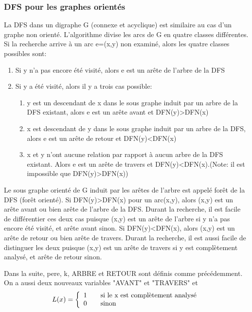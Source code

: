 \subsubsection{DFS pour les graphes orientés}
La DFS dans un digraphe G (connexe et acyclique) est similaire au cas d'un graphe non orienté. L'algorithme divise les arcs de G en quatre classes différentes. Si la recherche arrive à un arc e=(x,y) non examiné, alors les quatre classes possibles sont:
\begin{enumerate}
	\item Si y n'a pas encore été visité, alors e est un arête de l'arbre de la DFS
	\item Si y a été visité, alors il y a trois cas possible:
	\begin{enumerate}
		\item y est un descendant de x dans le sous graphe induit par un arbre de la DFS existant, alors e est un arête avant et DFN(y)>DFN(x)
		\item  x est descendant de y dans le sous graphe induit par un arbre de la DFS, alors e est un arête de retour et DFN(y)<DFN(x)
		\item x et y n'ont aucune relation par rapport à aucun arbre de la DFS existant. Alors e est un arête de travers et  DFN(y)<DFN(x).(Note: il est impossible que DFN(y)>DFN(x))
	\end{enumerate}
\end{enumerate}

Le sous graphe orienté de G induit par les arêtes de l'arbre est appelé forêt de la DFS (forêt orienté). Si DFN(y)>DFN(x) pour un arc(x,y), alors (x,y) est un arête avant ou bien arête de l'arbre de la DFS.
Durant la recherche, il est facile de différentier ces deux cas puisque (x,y) est un arête de l'arbre si y n'a pas encore été visité, et arête avant sinon. Si DFN(y)<DFN(x), alors (x,y) est un arête de retour ou bien arête de travers. Durant la recherche, il est aussi facile de distinguer les deux puisque (x,y) est un arête de travers si y est complètement analysé, et arête de retour sinon.


Dans la suite, pere, k, ARBRE et RETOUR sont définis comme précédemment. On a aussi deux nouveaux variables "AVANT" et "TRAVERS" et $$L(x)= \left\{
\begin{array}{l l}
1 & \quad \text{si le x est complètement analysé}\\
0 & \quad \text{sinon}
\end{array} \right. $$ 

